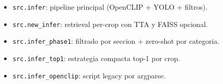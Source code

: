\begin{itemize}
  \item \texttt{src.infer}: pipeline principal (OpenCLIP + YOLO + filtros).
  \item \texttt{src.new\_infer}: retrieval per-crop con TTA y FAISS opcional.
  \item \texttt{src.infer\_phase1}: filtrado por seccion + zero-shot por categoria.
  \item \texttt{src.infer\_top1}: estrategia compacta top-1 por crop.
  \item \texttt{src.infer\_openclip}: script legacy por argparse.
\end{itemize}
